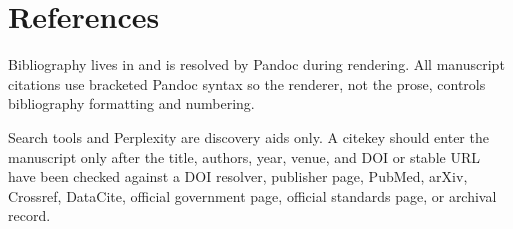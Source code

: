 \documentclass[
  english,
]{article}
\begin{document}
\newpage

\section{References}\label{sec:references}

Bibliography lives in
\href{references.bib}{} and is
resolved by Pandoc during rendering. All manuscript citations use
bracketed Pandoc syntax so the renderer, not the prose, controls
bibliography formatting and numbering.

Search tools and Perplexity are discovery aids only. A citekey should
enter the manuscript only after the title, authors, year, venue, and DOI
or stable URL have been checked against a DOI resolver, publisher page,
PubMed, arXiv, Crossref, DataCite, official government page, official
standards page, or archival record.



\providecommand{\bibsection}{}
\renewcommand{\bibsection}{}


\end{document}
